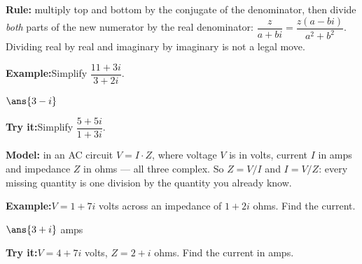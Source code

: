 \documentclass[12pt]{article}
\begin{document}
\begin{formulabox}
\textbf{Rule:} multiply top and bottom by the conjugate of the denominator,
then divide \emph{both} parts of the new numerator by the real denominator:
$\dfrac{z}{a+bi} = \dfrac{z(a-bi)}{a^2+b^2}$. Dividing real by real and
imaginary by imaginary is not a legal move.
\end{formulabox}
\begin{examplebox}
\textbf{Example:}\quad Simplify $\dfrac{11 + 3i}{3 + 2i}$.
\par
$\ans{3-i}$
\end{examplebox}
\begin{tryitbox}
\textbf{Try it:}\quad Simplify $\dfrac{5 + 5i}{1 + 3i}$.\\[2pt]
\end{tryitbox}

\begin{formulabox}
\textbf{Model:} in an AC circuit $V = I \cdot Z$, where voltage $V$ is in
volts, current $I$ in amps and impedance $Z$ in ohms --- all three complex.
So $Z = V / I$ and $I = V / Z$: every missing quantity is one division by the
quantity you already know.
\end{formulabox}
\begin{examplebox}
\textbf{Example:}\quad $V = 1 + 7i$ volts across an impedance of $1 + 2i$
ohms. Find the current.
\par
$\ans{3+i}$ amps
\end{examplebox}
\begin{tryitbox}
\textbf{Try it:}\quad $V = 4 + 7i$ volts, $Z = 2 + i$ ohms. Find the current in
amps.\\[2pt]
\end{tryitbox}
\end{document}
